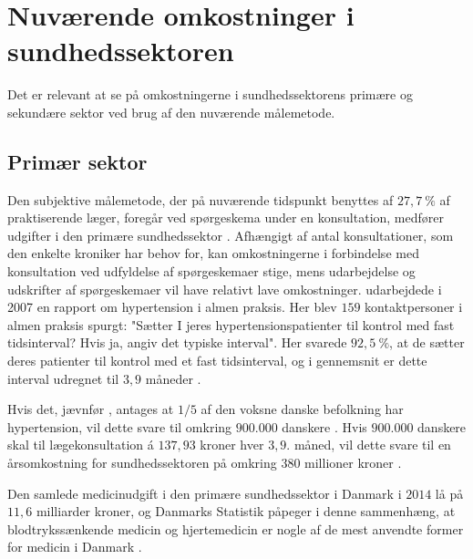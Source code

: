\section{Nuværende omkostninger i sundhedssektoren}
Det er relevant at se på omkostningerne i sundhedssektorens primære og sekundære sektor ved brug af den nuværende målemetode. 

\subsection{Primær sektor} \label{sec:nuv_primaer}
\label{sec:primaer_sektor_omkostninger}
Den subjektive målemetode, der på nuværende tidspunkt benyttes af $27,7~\%$ af praktiserende læger, foregår ved spørgeskema under en konsultation, medfører udgifter i den primære sundhedssektor \citep{munck2007}. Afhængigt af antal konsultationer, som den enkelte kroniker har behov for, kan omkostningerne i forbindelse med konsultation ved udfyldelse af spørgeskemaer stige, mens udarbejdelse og udskrifter af spørgeskemaer vil have relativt lave omkostninger.
\citeauthor{munck2007} udarbejdede i 2007 en rapport om hypertension i almen praksis. Her blev $159$ kontaktpersoner i almen praksis spurgt: "Sætter I jeres hypertensionspatienter til kontrol med fast tidsinterval? Hvis ja, angiv det typiske interval". Her svarede $92,5~\%$, at de sætter deres patienter til kontrol med et fast tidsinterval, og i gennemsnit er dette interval udregnet til $3,9$ måneder \citep{munck2007}. 

Hvis det, jævnfør \citeauthor{kronborg2008}, antages at $1/5$ af den voksne danske befolkning har hypertension, vil dette svare til omkring $900.000$ danskere \citep{folketal2016}. Hvis $900.000$ danskere skal til lægekonsultation á $137,93$ kroner hver $3,9$. måned, vil dette svare til en årsomkostning for sundhedssektoren på omkring $380$ millioner kroner \citep{honorartabel2016}. 

Den samlede medicinudgift i den primære sundhedssektor i Danmark i $2014$ lå på $11,6$ milliarder kroner, og Danmarks Statistik påpeger i denne sammenhæng, at blodtrykssænkende medicin og hjertemedicin er nogle af de mest anvendte former for medicin i Danmark \citep{dst2016}. 

